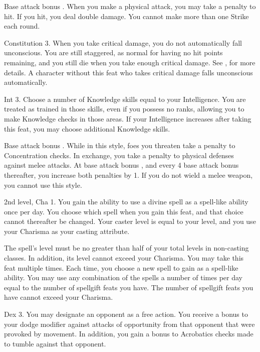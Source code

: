 \featpre Base attack bonus .
\featben When you make a physical attack, you may take a  penalty to hit. If you hit, you deal double damage. You cannot make more than one Strike each round.

 Constitution 3.
 When you take critical damage, you do not automatically fall unconscious. You are still staggered, as normal for having no hit points remaining, and you still die when you take enough critical damage. See , for more details.
 A character without this feat who takes critical damage falls unconscious automatically.

 Int 3.
 Choose a number of Knowledge skills equal to your Intelligence. You are treated as trained in those skills, even if you possess no ranks, allowing you to make Knowledge checks in those areas. If your Intelligence increases after taking this feat, you may choose additional Knowledge skills.

 Base attack bonus .
 While in this style, foes you threaten take a  penalty to Concentration checks. In exchange, you take a  penalty to physical defenses against melee attacks. At base attack bonus , and every 4 base attack bonus thereafter, you increase both penalties by 1. If you do not wield a melee weapon, you cannot use this style.

\featpre 2nd level, Cha 1.
\featben You gain the ability to use a divine spell as a spell-like ability once per day. You choose which spell when you gain this feat, and that choice cannot thereafter be changed. Your caster level is equal to your level, and you use your Charisma as your casting attribute.

The spell's level must be no greater than half of your total levels in non-casting classes. In addition, its level cannot exceed your Charisma.
 You may take this feat multiple times. Each time, you choose a new spell to gain as a spell-like ability. You may use any combination of the spells a number of times per day equal to the number of spellgift feats you have. The number of spellgift feats you have cannot exceed your Charisma.

 Dex 3.
 You may designate an opponent as a free action. You receive a  bonus to your dodge modifier against attacks of opportunity from that opponent that were provoked by movement. In addition, you gain a  bonus to Acrobatics checks made to tumble against that opponent.

